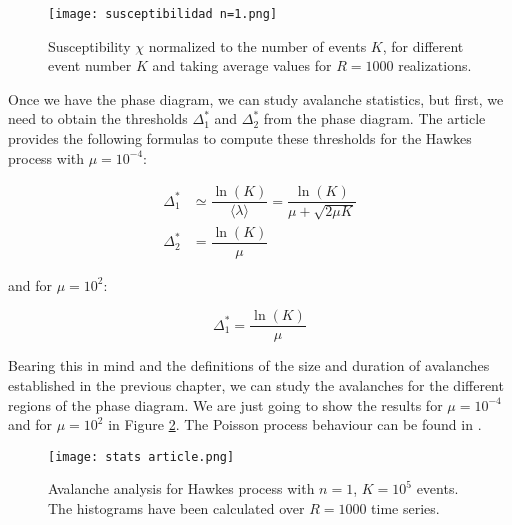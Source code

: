 \begin{figure}[H]
    \centering
    \texttt{[image: susceptibilidad n=1.png]}
    \caption{Susceptibility $\chi$ normalized to the number of events $K$, for different event number $K$ and taking average values for $R=1000$ realizations.}
    \label{f:susceptibilidad_article}   
\end{figure}

Once we have the phase diagram, we can study avalanche statistics, but first, we need to obtain the thresholds $\Delta_1^*$ and $\Delta_2^*$ from the phase diagram. 
The article \cite{notarmuzi2021percolation} provides the following formulas to compute these thresholds for the Hawkes process with $\mu=10^{-4}$:

\begin{align}
    \Delta_1^* &\simeq \dfrac{\ln(K)}{\langle \lambda \rangle}= \dfrac{\ln(K)}{\mu+\sqrt{2\mu K}} \label{eq:Ecuación delta1 *} \\
    \Delta_2^* &= \dfrac{\ln(K)}{\mu}\label{eq:Ecuación delta2 *}
\end{align}

and for $\mu=10^2$:

\begin{equation}
    \Delta_1^* = \dfrac{\ln(K)}{\mu}
\end{equation}

Bearing this in mind and the definitions of the size and duration of avalanches established in the previous chapter, we can study the avalanches for the different regions
of the phase diagram. We are just going to show the results for $\mu=10^{-4}$ and for $\mu=10^2$ in Figure \ref{f:avalanches_article}. The Poisson process behaviour can be found in 
\cite{stauffer2018introduction, stauffer1978critical}. 

\begin{figure}[H]
\centering
\texttt{[image: stats article.png]}
\caption{Avalanche analysis for Hawkes process with $n=1$, $K=10^5$ events. The histograms have been calculated over $R=1000$ time series.}
\label{f:avalanches_article}  
\end{figure}



